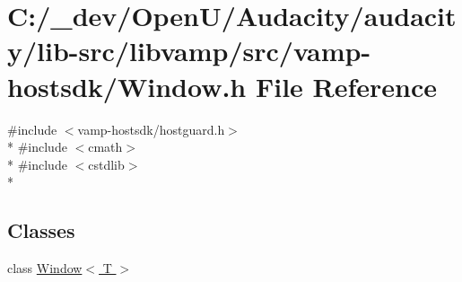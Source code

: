 \hypertarget{libvamp_2src_2vamp-hostsdk_2window_8h}{}\section{C\+:/\+\_\+dev/\+Open\+U/\+Audacity/audacity/lib-\/src/libvamp/src/vamp-\/hostsdk/\+Window.h File Reference}
\label{libvamp_2src_2vamp-hostsdk_2window_8h}
{\ttfamily \#include $<$vamp-\/hostsdk/hostguard.\+h$>$}\\*
{\ttfamily \#include $<$cmath$>$}\\*
{\ttfamily \#include $<$cstdlib$>$}\\*
\subsection*{Classes}
\begin{DoxyCompactItemize}
\item 
class \hyperlink{class_window}{Window$<$ T $>$}
\end{DoxyCompactItemize}
